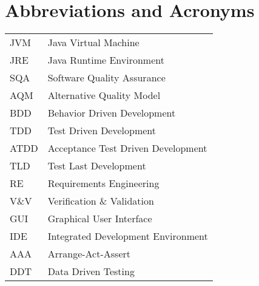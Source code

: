 \chapter*{Abbreviations and Acronyms}


\noindent
\begin{longtable}{@{}p{}p{}@{}}
JVM & Java Virtual Machine \\
JRE & Java Runtime Environment \\
SQA & Software Quality Assurance \\
AQM & Alternative Quality Model \\
BDD & Behavior Driven Development \\
TDD & Test Driven Development \\
ATDD & Acceptance Test Driven Development \\
TLD & Test Last Development \\
RE & Requirements Engineering \\
V\&V & Verification \& Validation \\
GUI & Graphical User Interface \\
IDE & Integrated Development Environment \\
AAA & Arrange-Act-Assert \\
DDT & Data Driven Testing \\
\end{longtable}
